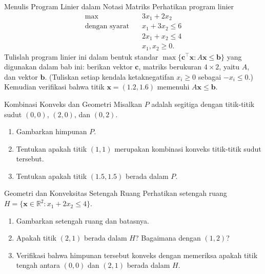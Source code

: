 \begin{ex}{Menulis Program Linier dalam Notasi Matriks}{}
\label{ex:lp-matrix-notation}
Perhatikan program linier
\begin{align*}
\max \quad & 3x_1 + 2x_2\\
\text{dengan syarat} \quad & x_1 + 3x_2 \leq 6\\
& 2x_1 + x_2 \leq 4\\
& x_1, x_2 \geq 0.
\end{align*}
Tulislah program linier ini dalam bentuk standar \( \max\{ \mathbf{c}^\top \mathbf{x} : A\mathbf{x} \leq \mathbf{b} \} \) yang digunakan dalam bab ini: berikan vektor \( \mathbf{c} \), matriks berukuran \( 4 \times 2 \), yaitu \( A \), dan vektor \( \mathbf{b} \). (Tuliskan setiap kendala ketaknegatifan \( x_i \geq 0 \) sebagai \( -x_i \leq 0 \).) Kemudian verifikasi bahwa titik \( \mathbf{x} = (1.2, 1.6) \) memenuhi \( A\mathbf{x} \leq \mathbf{b} \).
\exrefs{\S\ref{sec:math-preliminaries}, \S\ref{sec:algebraic-vertex-proof}}
\end{ex}


\begin{ex}{Kombinasi Konveks dan Geometri}{}
\label{ex:convex-combo-triangle}
Misalkan \( P \) adalah segitiga dengan titik-titik sudut \( (0,0) \), \( (2,0) \), dan \( (0,2) \).
\begin{enumerate}
    \item Gambarkan himpunan \( P \).
    \item Tentukan apakah titik \( (1,1) \) merupakan kombinasi konveks titik-titik sudut tersebut.
    \item Tentukan apakah titik \( (1.5,1.5) \) berada dalam \( P \).
\end{enumerate}
\exrefs{\S\ref{sec:convexity}}
\end{ex}

\begin{ex}{Geometri dan Konveksitas Setengah Ruang}{}
Perhatikan setengah ruang \( H = \{ \mathbf{x} \in \mathbb{R}^2 : x_1 + 2x_2 \leq 4 \} \).
\begin{enumerate}
    \item Gambarkan setengah ruang dan batasnya.
    \item Apakah titik \( (2,1) \) berada dalam \( H \)? Bagaimana dengan \( (1,2) \)?
    \item Verifikasi bahwa himpunan tersebut konveks dengan memeriksa apakah titik tengah antara \( (0,0) \) dan \( (2,1) \) berada dalam \( H \).
\end{enumerate}
\end{ex}

